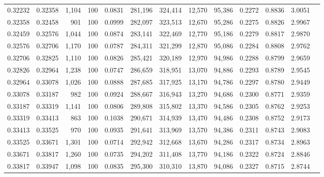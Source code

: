 \begin{tabular}{rrrrrrrrrrrrr}
0.32232 & 0.32358 & 1,104 & 100 &                                     0.0831 & 281,196 & 324,414 &  12,570 &  95,386 & 0.2272 & 0.8836 & 3.0051 \\
0.32358 & 0.32458 &   901 & 100 &                                     0.0999 & 282,097 & 323,513 &  12,670 &  95,286 & 0.2275 & 0.8826 & 2.9967 \\
0.32459 & 0.32576 & 1,044 & 100 &                                     0.0874 & 283,141 & 322,469 &  12,770 &  95,186 & 0.2279 & 0.8817 & 2.9870 \\
0.32576 & 0.32706 & 1,170 & 100 &                                     0.0787 & 284,311 & 321,299 &  12,870 &  95,086 & 0.2284 & 0.8808 & 2.9762 \\
0.32706 & 0.32825 & 1,110 & 100 &                                     0.0826 & 285,421 & 320,189 &  12,970 &  94,986 & 0.2288 & 0.8799 & 2.9659 \\
0.32826 & 0.32964 & 1,238 & 100 &                                     0.0747 & 286,659 & 318,951 &  13,070 &  94,886 & 0.2293 & 0.8789 & 2.9545 \\
0.32964 & 0.33078 & 1,026 & 100 &                                     0.0888 & 287,685 & 317,925 &  13,170 &  94,786 & 0.2297 & 0.8780 & 2.9449 \\
0.33078 & 0.33187 &   982 & 100 &                                     0.0924 & 288,667 & 316,943 &  13,270 &  94,686 & 0.2300 & 0.8771 & 2.9359 \\
0.33187 & 0.33319 & 1,141 & 100 &                                     0.0806 & 289,808 & 315,802 &  13,370 &  94,586 & 0.2305 & 0.8762 & 2.9253 \\
0.33319 & 0.33413 &   863 & 100 &                                     0.1038 & 290,671 & 314,939 &  13,470 &  94,486 & 0.2308 & 0.8752 & 2.9173 \\
0.33413 & 0.33525 &   970 & 100 &                                     0.0935 & 291,641 & 313,969 &  13,570 &  94,386 & 0.2311 & 0.8743 & 2.9083 \\
0.33525 & 0.33671 & 1,301 & 100 &                                     0.0714 & 292,942 & 312,668 &  13,670 &  94,286 & 0.2317 & 0.8734 & 2.8963 \\
0.33671 & 0.33817 & 1,260 & 100 &                                     0.0735 & 294,202 & 311,408 &  13,770 &  94,186 & 0.2322 & 0.8724 & 2.8846 \\
0.33817 & 0.33947 & 1,098 & 100 &                                     0.0835 & 295,300 & 310,310 &  13,870 &  94,086 & 0.2327 & 0.8715 & 2.8744 \\

\end{tabular}
